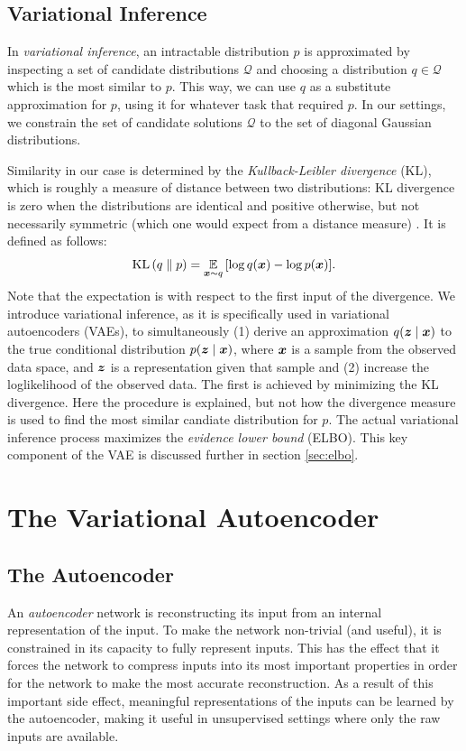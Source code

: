 \subsection{Variational Inference}
\label{sec:variational_inference}
In \textit{variational inference}, an intractable distribution $p$ is approximated by inspecting a set of candidate distributions $\mathcal{Q}$ and choosing a distribution $q \in \mathcal{Q}$ which is the most similar to $p$. This way, we can use $q$ as a substitute approximation for $p$, using it for whatever task that required $p$. In our settings, we constrain the set of candidate solutions $\mathcal{Q}$ to the set of diagonal Gaussian distributions.

Similarity in our case is determined by the \textit{Kullback-Leibler divergence} (KL), which is roughly a measure of distance between two distributions: KL divergence is zero when the distributions are identical and positive otherwise, but not necessarily symmetric (which one would expect from a distance measure) \cite{standfordVAE}. It is defined as follows:
\[ \operatorname{KL}{\mathopen{} \left(q \parallel p\right) \mathclose{}} =  \operatorname*{\mathbb{E}}_{\bm{ x }\sim q}{\mathopen{} \left[ \log q(\bm{ x }) - \log p(\bm{ x }) \right] \mathclose{}}.\]
Note that the expectation is with respect to the first input of the divergence. We introduce variational inference, as it is specifically used in variational autoencoders (VAEs), to simultaneously (1) derive an approximation $q{\mathopen{} \left( \bm{ z } \mid \bm{ x } \right) \mathclose{}}$ to the true conditional distribution $p{\mathopen{} \left( \bm{ z } \mid \bm{ x } \right) \mathclose{}}$, where $\bm{ x }$ is a sample from the observed data space, and $\bm{ z }$ is a representation given that sample and (2) increase the loglikelihood of the observed data. The first is achieved by minimizing the KL divergence. Here the procedure is explained, but not how the divergence measure is used to find the most similar candiate distribution for $p$. The actual variational inference process maximizes the \textit{evidence lower bound} (ELBO). This key component of the VAE is discussed further in section \ref{sec:elbo}.


\section{The Variational Autoencoder}
\label{sec:variational_autoencoder}

\subsection{The Autoencoder}
\label{sec:autoencoders}
An \textit{autoencoder} network is reconstructing its input from an internal representation of the input. To make the network non-trivial (and useful), it is constrained in its capacity to fully represent inputs. This has the effect that it forces the network to compress inputs into its most important properties in order for the network to make the most accurate reconstruction. As a result of this important side effect, meaningful representations of the inputs can be learned by the autoencoder, making it useful in unsupervised settings where only the raw inputs are available.

